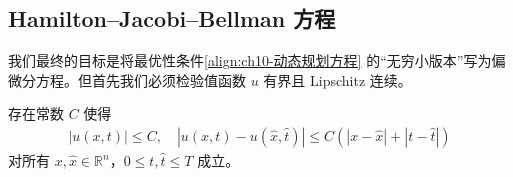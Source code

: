 \documentclass[../../main.tex]{subfiles}
\begin{document}
\subsection{Hamilton--Jacobi--Bellman 方程}\label{subsection:ch10-HJB方程}

我们最终的目标是将最优性条件\eqref{align:ch10-动态规划方程} 的``无穷小版本''写为偏微分方程。但首先我们必须检验值函数 $u$ 有界且 Lipschitz 连续。

\begin{lemma}[值函数的估计。]\label{lemma:ch10-值函数估计}存在常数 $C$ 使得
\begin{align*}
|u(x,t)|\leqslant C,\quad |u(x,t)-u(\widehat{x},\widehat{t})|\leqslant C(|x-\widehat{x}|+|t-\widehat{t}|)
\end{align*}
对所有 $x,\widehat{x}\in\mathbb{R}^n$，$0\leqslant t,\widehat{t}\leqslant T$ 成立。
\end{lemma}
\end{document}
